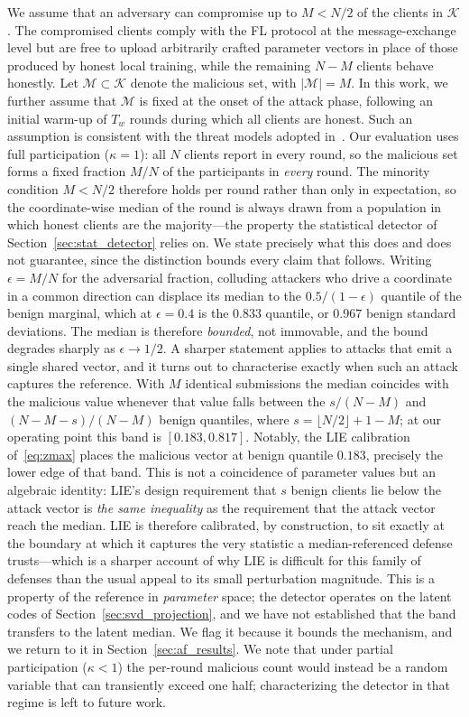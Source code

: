 \documentclass[journal]{IEEEtran}
\begin{document}
We assume that an adversary can compromise up to $M < N/2$ of the clients in $\mathcal{K}$. The compromised clients comply with the FL protocol at the message-exchange level but are free to upload arbitrarily crafted parameter vectors in place of those produced by honest local training, while the remaining $N - M$ clients behave honestly. Let $\mathcal{M} \subset \mathcal{K}$ denote the malicious set, with $|\mathcal{M}| = M$. In this work, we further assume that $\mathcal{M}$ is fixed at the onset of the attack phase, following an initial warm-up of $T_w$ rounds during which all clients are honest. Such an assumption is consistent with the threat models adopted in~\cite{baruch2019little, shejwalkar2021manipulating}. Our evaluation uses full participation ($\kappa=1$): all $N$ clients report in every round, so the malicious set forms a fixed fraction $M/N$ of the participants in \emph{every} round. The minority condition $M<N/2$ therefore holds per round rather than only in expectation, so the coordinate-wise median of the round is always drawn from a population in which honest clients are the majority---the property the statistical detector of Section~\ref{sec:stat_detector} relies on. We state precisely what this does and does not guarantee, since the distinction bounds every claim that follows. Writing $\epsilon = M/N$ for the adversarial fraction, colluding attackers who drive a coordinate in a common direction can displace its median to the $0.5/(1-\epsilon)$ quantile of the benign marginal, which at $\epsilon = 0.4$ is the $0.833$ quantile, or $0.967$ benign standard deviations. The median is therefore \emph{bounded}, not immovable, and the bound degrades sharply as $\epsilon \to 1/2$. A sharper statement applies to attacks that emit a single shared vector, and it turns out to characterise exactly when such an attack captures the reference. With $M$ identical submissions the median coincides with the malicious value whenever that value falls between the $s/(N-M)$ and $(N-M-s)/(N-M)$ benign quantiles, where $s = \lfloor N/2 \rfloor + 1 - M$; at our operating point this band is $[0.183, 0.817]$. Notably, the LIE calibration of~\eqref{eq:zmax} places the malicious vector at benign quantile $0.183$, precisely the lower edge of that band. This is not a coincidence of parameter values but an algebraic identity: LIE's design requirement that $s$ benign clients lie below the attack vector is \emph{the same inequality} as the requirement that the attack vector reach the median. LIE is therefore calibrated, by construction, to sit exactly at the boundary at which it captures the very statistic a median-referenced defense trusts---which is a sharper account of why LIE is difficult for this family of defenses than the usual appeal to its small perturbation magnitude. This is a property of the reference in \emph{parameter} space; the detector operates on the latent codes of Section~\ref{sec:svd_projection}, and we have not established that the band transfers to the latent median. We flag it because it bounds the mechanism, and we return to it in Section~\ref{sec:af_results}. We note that under partial participation ($\kappa<1$) the per-round malicious count would instead be a random variable that can transiently exceed one half; characterizing the detector in that regime is left to future work.
\end{document}
